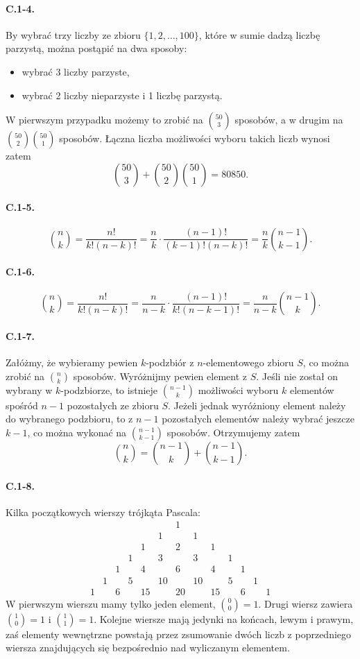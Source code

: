 \paragraph{C.1-4.}
By wybrać trzy liczby ze zbioru $\{1,2,\dots,100\}$, które w sumie dadzą liczbę parzystą, można postąpić na dwa sposoby:
\begin{itemize}
	\item wybrać 3 liczby parzyste,
	\item wybrać 2 liczby nieparzyste i 1 liczbę parzystą.
\end{itemize}
W pierwszym przypadku możemy to zrobić na $\binom{50}{3}$ sposobów, a w drugim na $\binom{50}{2}\binom{50}{1}$ sposobów. Łączna liczba możliwości wyboru takich liczb wynosi zatem
\[
	\binom{50}{3}+\binom{50}{2}\binom{50}{1} = 80850.
\]

\paragraph{C.1-5.}
\[
	\binom{n}{k} = \frac{n!}{k!(n-k)!} = \frac{n}{k}\cdot\frac{(n-1)!}{(k-1)!(n-k)!} = \frac{n}{k}\binom{n-1}{k-1}.
\]

\paragraph{C.1-6.}
\[
	\binom{n}{k} = \frac{n!}{k!(n-k)!} = \frac{n}{n-k}\cdot\frac{(n-1)!}{k!(n-k-1)!} = \frac{n}{n-k}\binom{n-1}{k}.
\]

\paragraph{C.1-7.}
Załóżmy, że wybieramy pewien $k$-podzbiór z $n$-elementowego zbioru $S$, co można zrobić na $\binom{n}{k}$ sposobów. Wyróżnijmy pewien element z $S$. Jeśli nie został on wybrany w $k$-podzbiorze, to istnieje $\binom{n-1}{k}$ możliwości wyboru $k$ elementów spośród $n-1$ pozostałych ze zbioru $S$. Jeżeli jednak wyróżniony element należy do wybranego podzbioru, to z $n-1$ pozostałych elementów należy wybrać jeszcze $k-1$, co można wykonać na $\binom{n-1}{k-1}$ sposobów. Otrzymujemy zatem
\[
	\binom{n}{k} = \binom{n-1}{k}+\binom{n-1}{k-1}.
\]

\paragraph{C.1-8.}
Kilka początkowych wierszy trójkąta Pascala:
\[
	\begin{array}{ccccccccccccc}
		&&&&&&1 \\
		&&&&&1&&1 \\
		&&&&1&&2&&1 \\
		&&&1&&3&&3&&1 \\
		&&1&&4&&6&&4&&1 \\
		&1&&5&&10&&10&&5&&1 \\
		1&&6&&15&&20&&15&&6&&1
	\end{array}
\]
W pierwszym wierszu mamy tylko jeden element, $\binom{0}{0}=1$. Drugi wiersz zawiera $\binom{1}{0}=1$ i $\binom{1}{1}=1$. Kolejne wiersze mają jedynki na końcach, lewym i prawym, zaś elementy wewnętrzne powstają przez zsumowanie dwóch liczb z poprzedniego wiersza znajdujących się bezpośrednio nad wyliczanym elementem.


